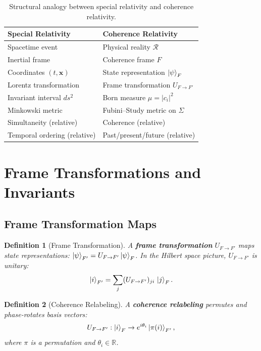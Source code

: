 \documentclass[aps,prd,twocolumn,superscriptaddress,nofootinbib,floatfix]{revtex4-2}
\newtheorem{definition}{Definition}
\newcommand{\Sig}{\Sigma}
\begin{document}
\begin{table}[b]
\centering
\caption{Structural analogy between special relativity and coherence relativity.}\label{tab:analogy}
\begin{tabular}{@{}ll@{}}
\toprule
Special Relativity & Coherence Relativity \\
\midrule
Spacetime event & Physical reality $\mathcal{R}$ \\
Inertial frame & Coherence frame $F$ \\
Coordinates $(t, \mathbf{x})$ & State representation $\ket{\psi}_F$ \\
Lorentz transformation & Frame transformation $U_{F \to F'}$ \\
Invariant interval $ds^2$ & Born measure $\mu = |c_i|^2$ \\
Minkowski metric & Fubini--Study metric on $\Sig$ \\
Simultaneity (relative) & Coherence (relative) \\
Temporal ordering (relative) & Past/present/future (relative) \\
\bottomrule
\end{tabular}
\end{table}


\section{Frame Transformations and Invariants}\label{sec:transformations}

\subsection{Frame Transformation Maps}

\begin{definition}[Frame Transformation]
A \textbf{frame transformation} $U_{F \to F'}$ maps state representations: $\ket{\psi}_{F'} = U_{F \to F'}\ket{\psi}_F$. In the Hilbert space picture, $U_{F \to F'}$ is unitary:
\begin{equation}
\ket{i}_{F'} = \sum_j (U_{F \to F'})_{ji}\, \ket{j}_F.
\end{equation}
\end{definition}

\begin{definition}[Coherence Relabeling]
A \textbf{coherence relabeling} permutes and phase-rotates basis vectors:
\begin{equation}\label{eq:relabeling}
U_{F \to F'}: \ket{i}_F \to e^{i\theta_i}\ket{\pi(i)}_{F'},
\end{equation}
where $\pi$ is a permutation and $\theta_i \in \mathbb{R}$.
\end{definition}
\end{document}
